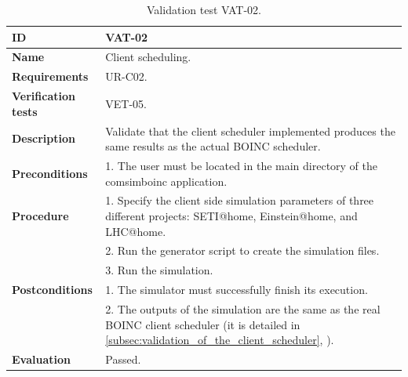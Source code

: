 \begin{center}
\begin{table}[htb]
\centering
\begin{tabular}{@{}p{2.5cm} p{13cm}@{}} 
\toprule
\textbf{ID} 					& VAT-02 \\
\midrule
\textbf{Name} 				& Client \gls{scheduling}. \\
\midrule
\textbf{Requirements} 		& UR-C02. \\
\midrule
\textbf{Verification tests} 	& VET-05. \\
\midrule
\textbf{Description} 		& Validate that the client scheduler implemented produces the same results as the actual BOINC scheduler. \\
\midrule
\textbf{Preconditions}		&  1. The user must be located in the main directory of the \gls{comsimboinc} application. \\
\midrule
\textbf{Procedure}			& 1. Specify the client side simulation parameters of three different projects: SETI@home, Einstein@home, and LHC@home. \\
							& 2. Run the generator script to create the simulation files. \\
							& 3. Run the simulation. \\ 
\midrule
\textbf{Postconditions} 		& 1. The simulator must successfully finish its execution. \\
							& 2. The outputs of the simulation are the same as the real BOINC client scheduler (it is detailed in \ref{subsec:validation_of_the_client_scheduler}, \textit{\nameref{subsec:validation_of_the_client_scheduler}}). \\
\midrule
\textbf{Evaluation} 			& Passed. \\
\bottomrule
\end{tabular}
\caption{Validation test VAT-02.}
\label{tab:vat-02}
\end{table}
\end{center}


